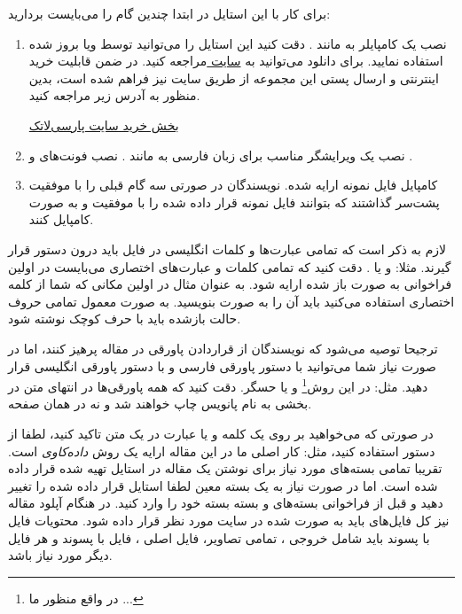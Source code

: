 \documentclass{CSICC2020}
\begin{document}
برای کار با این استایل در ابتدا چندین گام را می‌بایست بردارید:
\begin{enumerate} 
\item
نصب یک کامپایلر به مانند . دقت کنید این استایل را می‌توانید توسط
 ویا 
بروز شده استفاده نمایید. برای  دانلود  می‌توانید به
\href{www.tug.org/texlive/}{سایت }
مراجعه کنید. در ضمن قابلیت خرید اینترنتی و ارسال پستی این مجموعه از طریق سایت  نیز فراهم شده است، بدین منظور به آدرس زیر مراجعه کنید.

\href{http://parsilatex.com/site/product/%D9%85%D8%AC%D9%85%D9%88%D8%B9%D9%87-%D9%BE%D8%A7%D8%B1%D8%B3%DB%8C%E2%80%8C%D9%84%D8%A7%D8%AA%DA%A9/}{
بخش خرید سایت پارسی‌لاتک}


\item
نصب یک ویرایشگر مناسب برای زبان فارسی به مانند .
نصب فونت‌های  و .
\item
کامپایل فایل نمونه ارایه شده. نویسندگان در صورتی سه گام قبلی را با موفقیت پشت‌سر گذاشتند که بتوانند فایل نمونه قرار داده شده را با موفقیت و به صورت  کامپایل کنند. 
\end{enumerate}
لازم به ذکر است که تمامی عبارت‌ها و کلمات انگلیسی در فایل \lr{\LaTeX} باید درون دستور  قرار گیرند. مثلا:
 و یا .
دقت کنید که تمامی کلمات و عبارت‌های اختصاری می‌بایست در اولین فراخوانی به صورت باز شده ارایه شود. به عنوان مثال در اولین مکانی که شما از کلمه اختصاری   استفاده می‌کنید باید آن را به صورت 
بنویسید. به صورت معمول تمامی حروف حالت بازشده باید با حرف کوچک نوشته شود.

ترجیحا توصیه می‌شود که نویسندگان از قراردادن پاورقی در مقاله پرهیز کنند، اما در صورت نیاز شما می‌توانید با دستور  پاورقی فارسی و با دستور  پاورقی انگلیسی قرار دهید. مثل: در این روش\footnote{در واقع منظور ما ...} و یا حسگر. دقت کنید که همه پاورقی‌ها در انتهای متن در بخشی به نام پانویس چاپ خواهند شد و نه در همان صفحه.

در صورتی که می‌خواهید بر روی یک کلمه و یا عبارت در یک متن تاکید کنید، لطفا از دستور  استفاده کنید، مثل: کار اصلی ما در این مقاله ارایه یک روش
\emph{داده‌کاوی}
است. تقریبا تمامی بسته‌های مورد نیاز برای نوشتن یک مقاله در استایل \lr{\LaTeX} تهیه شده قرار داده شده است. اما در صورت نیاز به یک بسته معین لطفا استایل قرار داده شده را تغییر دهید و قبل از فراخوانی بسته‌های  و بسته \lr{\XePersian} بسته خود را وارد کنید. در هنگام آپلود مقاله نیز کل فایل‌های \lr{\LaTeX} باید به صورت  شده در سایت مورد نظر قرار داده شود. محتویات فایل با پسوند  باید شامل خروجی ، تمامی تصاویر، فایل اصلی ، فایل با پسوند  و هر فایل دیگر مورد نیاز باشد.
\end{document}
